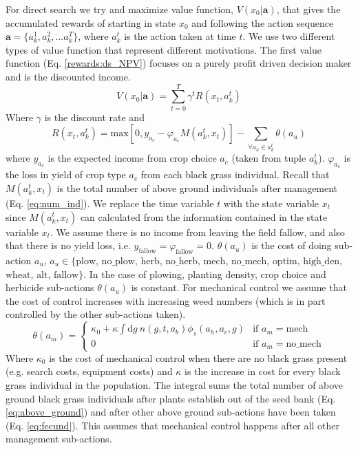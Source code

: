 \documentclass[12pt, a4paper]{article}
\begin{document}
For direct search we try and maximize value function, $V(x_0|\mathbf{a})$, that gives the accumulated rewards of starting in state $x_0$ and following the action sequence $\mathbf{a} = \{a_k^1, a_k^2, ... a_k^T\}$, where $a_k^t$ is the action taken at time $t$. We use two different types of value function that represent different motivations. The first value function (Eq. \ref{rewards:ds_NPV}) focuses on a purely profit driven decision maker and is the discounted income. 
\begin{equation}\label{rewards:ds_NPV}
	V(x_0|\mathbf{a}) = \sum_{t = 0}^{T} \gamma^t R(x_t, a_k^t) 
\end{equation}
Where $\gamma$ is the discount rate and 
\begin{equation}\label{rewards:immediate}
	R(x_t, a_k^t) = \text{max}\left[0, y_{a_c} - \varphi_{a_c} M(a_k^t, x_t)\right] - \sum_{\forall a_u \in a_k^t} \theta(a_u)  
\end{equation}
where $y_{a_c}$ is the expected income from crop choice $a_c$ (taken from tuple $a_k^t$). $\varphi_{a_c}$ is the loss in yield of crop type $a_c$ from each black grass individual. Recall that $M(a_k^t, x_t)$ is the total number of above ground individuals after management (Eq. \ref{eq:num_ind}). We replace the time variable $t$ with the state variable $x_t$ since $M(a_k^t, x_t)$ can calculated from the information contained in the state variable $x_t$. We assume there is no income from leaving the field fallow, and also that there is no yield loss, i.e. $y_\text{fallow} = \varphi_\text{fallow} = 0$. $\theta(a_u)$ is the cost of doing sub-action $a_u$, $a_u \in \{\text{plow}$, $\text{no\_plow}$, $\text{herb}$, $\text{no\_herb}$, $\text{mech}$, $\text{no\_mech}$, $\text{optim}$, $\text{high\_den}$, $\text{wheat}$, $\text{alt}$, $\text{fallow}\}$. In the case of plowing, planting density, crop choice and herbicide sub-actions $\theta(a_u)$ is constant. For mechanical control we assume that the cost of control increases with increasing weed numbers (which is in part controlled by the other sub-actions taken).
\begin{equation}\label{eq:cost_mech}
	\theta(a_m) = \begin{cases}
	\kappa_0 + \kappa \int \text{d}g~ n(g, t, a_b)\phi_s(a_h, a_c, g) &\text{if } a_m = \text{mech}\\
	0 &\text{if } a_m = \text{no\_mech}
	\end{cases} 
\end{equation}    
Where $\kappa_0$ is the cost of mechanical control when there are no black grass present (e.g. search costs, equipment costs) and $\kappa$ is the increase in cost for every black grass individual in the population. The integral sums the total number of above ground black grass individuals after plants establish out of the seed bank (Eq. \ref{eq:above_ground}) and after other above ground sub-actions have been taken (Eq. \ref{eq:fecund}). This assumes that mechanical control happens after all other management sub-actions. 
\end{document}

